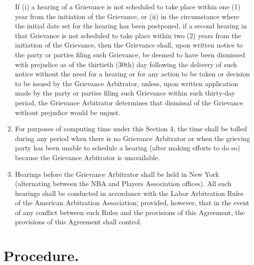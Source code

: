 \documentclass[
]{book}
\begin{document}
\begin{enumerate}
  If (i) a hearing of a Grievance is not scheduled to take place within one (1) year from the initiation of the Grievance, or (ii) in the circumstance where the initial date set for the hearing has been postponed, if a second hearing in that Grievance is not scheduled to take place within two (2) years from the initiation of the Grievance, then the Grievance shall, upon written notice to the party or parties filing such Grievance, be deemed to have been dismissed with prejudice as of the thirtieth (30th) day following the delivery of such notice without the need for a hearing or for any action to be taken or decision to be issued by the Grievance Arbitrator, unless, upon written application made by the party or parties filing such Grievance within such thirty-day period, the Grievance Arbitrator determines that dismissal of the Grievance without prejudice would be unjust.
\item
  For purposes of computing time under this Section 4, the time shall be tolled during any period when there is no Grievance Arbitrator or when the grieving party has been unable to schedule a hearing (after making efforts to do so) because the Grievance Arbitrator is unavailable.
\item
  Hearings before the Grievance Arbitrator shall be held in New York (alternating between the NBA and Players Association offices). All such hearings shall be conducted in accordance with the Labor Arbitration Rules of the American Arbitration Association; provided, however, that in the event of any conflict between such Rules and the provisions of this Agreement, the provisions of this Agreement shall control.
\end{enumerate}

\hypertarget{procedure.}{%
\section{Procedure.}\label{procedure.}}
\end{document}
